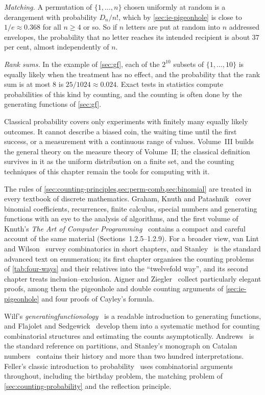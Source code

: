 \emph{Matching.} A permutation of $\{1,\ldots,n\}$ chosen uniformly at random is a derangement with probability $D_n/n!$, which by \cref{sec:ie-pigeonhole} is close to $1/e\approx0.368$ for all $n\ge4$ or so. So if $n$ letters are put at random into $n$ addressed envelopes, the probability that no letter reaches its intended recipient is about $37$ per cent, almost independently of $n$.

\emph{Rank sums.} In the example of \cref{sec:gf}, each of the $2^{10}$ subsets of $\{1,\ldots,10\}$ is equally likely when the treatment has no effect, and the probability that the rank sum is at most $8$ is $25/1024\approx0.024$. Exact tests in statistics compute probabilities of this kind by counting, and the counting is often done by the generating functions of \cref{sec:gf}.

Classical probability covers only experiments with finitely many equally likely outcomes. It cannot describe a biased coin, the waiting time until the first success, or a measurement with a continuous range of values. Volume~III builds the general theory on the measure theory of Volume~II; the classical definition survives in it as the uniform distribution on a finite set, and the counting techniques of this chapter remain the tools for computing with it.

\chapternotes

The rules of \cref{sec:counting-principles,sec:perm-comb,sec:binomial} are treated in every textbook of discrete mathematics. Graham, Knuth and Patashnik~\cite{graham1994concrete} cover binomial coefficients, recurrences, finite calculus, special numbers and generating functions with an eye to the analysis of algorithms, and the first volume of Knuth's \emph{The Art of Computer Programming}~\cite{knuth1997taocp1} contains a compact and careful account of the same material (Sections~1.2.5--1.2.9). For a broader view, van Lint and Wilson~\cite{vanlint2001} survey combinatorics in short chapters, and Stanley~\cite{stanley2012ec1} is the standard advanced text on enumeration; its first chapter organises the counting problems of \cref{tab:four-ways} and their relatives into the ``twelvefold way'', and its second chapter treats inclusion--exclusion. Aigner and Ziegler~\cite{aigner2018proofs} collect particularly elegant proofs, among them the pigeonhole and double counting arguments of \cref{sec:ie-pigeonhole} and four proofs of Cayley's formula.

Wilf's \emph{generatingfunctionology}~\cite{wilf2006} is a readable introduction to generating functions, and Flajolet and Sedgewick~\cite{flajolet2009} develop them into a systematic method for counting combinatorial structures and estimating the counts asymptotically. Andrews~\cite{andrews1976partitions} is the standard reference on partitions, and Stanley's monograph on Catalan numbers~\cite{stanley2015catalan} contains their history and more than two hundred interpretations. Feller's classic introduction to probability~\cite{feller1968} uses combinatorial arguments throughout, including the birthday problem, the matching problem of \cref{sec:counting-probability} and the reflection principle.

